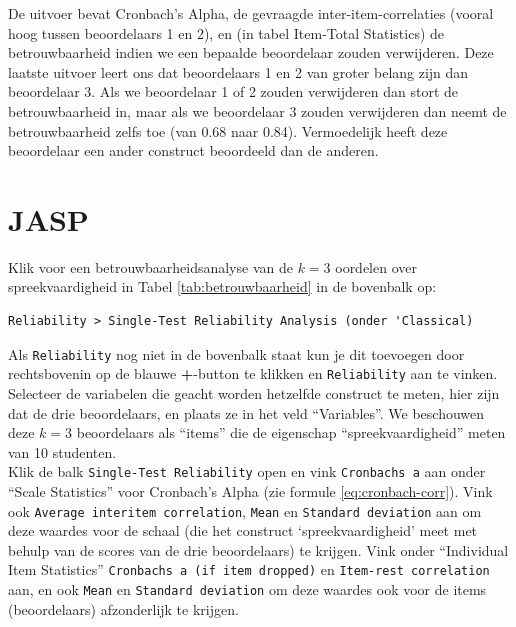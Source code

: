\documentclass[
]{book}
\begin{document}
De uitvoer bevat Cronbach's Alpha, de gevraagde
inter-item-correlaties (vooral hoog tussen beoordelaars 1 en 2), en (in
tabel Item-Total Statistics) de betrouwbaarheid indien we een bepaalde
beoordelaar zouden verwijderen. Deze laatste uitvoer leert ons dat
beoordelaars 1 en 2 van groter belang zijn dan beoordelaar 3. Als we
beoordelaar 1 of 2 zouden verwijderen dan stort de betrouwbaarheid in,
maar als we beoordelaar 3 zouden verwijderen dan neemt de
betrouwbaarheid zelfs toe (van 0.68 naar 0.84). Vermoedelijk heeft deze
beoordelaar een ander construct beoordeeld dan de anderen.

\section{JASP}\label{jasp-11}

Klik voor een betrouwbaarheidsanalyse van de \(k=3\) oordelen over spreekvaardigheid in Tabel \ref{tab:betrouwbaarheid} in de bovenbalk op:\\

\begin{verbatim}
Reliability > Single-Test Reliability Analysis (onder 'Classical)
\end{verbatim}

Als \texttt{Reliability} nog niet in de bovenbalk staat kun je dit toevoegen door rechtsbovenin op de blauwe \textbf{+}-button te klikken en \texttt{Reliability} aan te vinken.\\
Selecteer de variabelen die geacht worden hetzelfde construct te meten, hier zijn dat de drie beoordelaars, en plaats ze in het veld ``Variables''. We beschouwen deze \(k=3\) beoordelaars als ``items'' die de eigenschap ``spreekvaardigheid'' meten van 10 studenten.\\
Klik de balk \texttt{Single-Test\ Reliability} open en vink \texttt{Cronbach\textquotesingle{}s\ a} aan onder ``Scale Statistics'' voor Cronbach's Alpha (zie formule \eqref{eq:cronbach-corr}). Vink ook \texttt{Average\ interitem\ correlation}, \texttt{Mean} en \texttt{Standard\ deviation} aan om deze waardes voor de schaal (die het construct `spreekvaardigheid' meet met behulp van de scores van de drie beoordelaars) te krijgen. Vink onder ``Individual Item Statistics'' \texttt{Cronbach\textquotesingle{}s\ a\ (if\ item\ dropped)} en \texttt{Item-rest\ correlation} aan, en ook \texttt{Mean} en \texttt{Standard\ deviation} om deze waardes ook voor de items (beoordelaars) afzonderlijk te krijgen.\\
\end{document}
